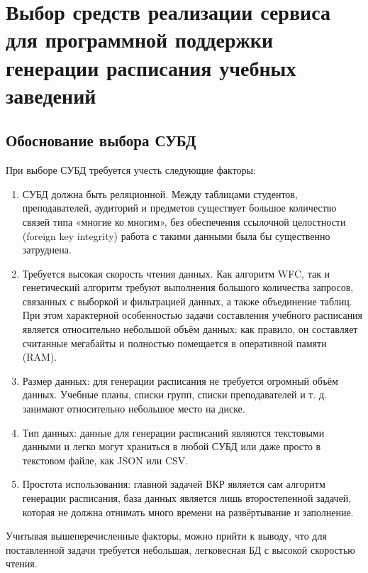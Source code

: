 \section{Выбор средств реализации сервиса для программной поддержки генерации расписания учебных заведений}

\subsection{Обоснование выбора СУБД}

При выборе СУБД требуется учесть следующие факторы:

\begin{enumerate}
	\item СУБД должна быть реляционной. Между таблицами студентов, преподавателей, аудиторий и предметов существует большое количество связей типа «многие ко многим», без обеспечения ссылочной целостности (foreign key integrity) работа с такими данными была бы существенно затруднена.
	
	\item Требуется высокая скорость чтения данных. Как алгоритм WFC, так и генетический алгоритм требуют выполнения большого количества запросов, связанных с выборкой и фильтрацией данных, а также объединение таблиц. При этом характерной особенностью задачи составления учебного расписания является относительно небольшой объём данных: как правило, он составляет считанные мегабайты и полностью помещается в оперативной памяти (RAM).
	
	\item Размер данных: для генерации расписания не требуется огромный объём данных. Учебные планы, списки групп, списки преподавателей и т. д. занимают относительно небольшое место на диске.
	
	\item Тип данных: данные для генерации расписаний являются текстовыми данными и легко могут храниться в любой СУБД или даже просто в текстовом файле, как JSON или CSV.
	
	\item Простота использования: главной задачей ВКР является сам алгоритм генерации расписания, база данных является лишь второстепенной задачей, которая не должна отнимать много времени на развёртывание и заполнение.
\end{enumerate}

Учитывая вышеперечисленные факторы, можно прийти к выводу, что для поставленной задачи требуется небольшая, легковесная БД с высокой скоростью чтения.

